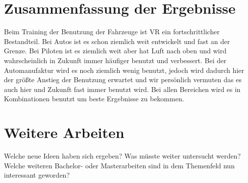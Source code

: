 \section{Zusammenfassung der Ergebnisse}
Beim Training der Benutzung der Fahrzeuge ist VR ein fortschrittlicher Bestandteil. Bei Autos ist es schon ziemlich weit entwickelt und fast an der Grenze. Bei Piloten ist es ziemlich weit aber hat Luft nach oben und wird wahrscheinlich in Zukunft immer häufiger benutzt und verbessert. Bei der Automanufaktur wird es noch ziemlich wenig benutzt, jedoch wird dadurch hier der größte Anstieg der Benutzung erwartet und wir persönlich vermuten das es auch hier und Zukunft fast immer benutzt wird. Bei allen Bereichen wird es in Kombinationen benutzt um beste Ergebnisse zu bekommen.

\section{Weitere Arbeiten}
Welche neue Ideen haben sich ergeben?
Was müsste weiter untersucht werden?
Welche weiteren Bachelor- oder Masterarbeiten sind in dem Themenfeld nun interessant geworden?
